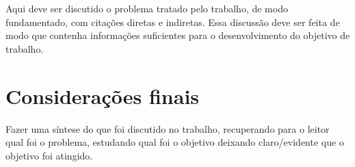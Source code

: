 \documentclass[
	article,			
	11pt,				
	oneside,			
	a4paper,			
	english,			
	brazil,				
	sumario=tradicional
	]{abntex2}
\begin{document}
    Aqui deve ser discutido o problema tratado pelo trabalho, de modo fundamentado,
    com citações diretas e indiretas. Essa discussão deve ser feita de modo que
    contenha informações suficientes para o desenvolvimento do objetivo de trabalho.

\newpage
% 
\section{Considerações finais}

    Fazer uma síntese do que foi discutido no trabalho, recuperando para o leitor qual
    foi o problema, estudando qual foi o objetivo deixando claro/evidente que o objetivo
    foi atingido.

\postextual

\newpage
% 

\end{document}
